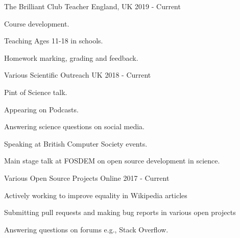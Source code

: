 \begin{cventries}
   \cventry
    {The Brilliant Club}
    {Teacher} %
    {England, UK}
    {2019 - Current}
    {\begin{cvitems} %
        \item {Course development.}
        \item {Teaching Ages 11-18 in schools.}
        \item {Homework marking, grading and feedback.}
      \end{cvitems}} %

   \cventry
    {Various}
    {Scientific Outreach} %
    {UK}
    {2018 - Current}
    {\begin{cvitems} %
        \item {Pint of Science talk.}
        \item {Appearing on Podcasts.}
        \item {Answering science questions on social media.}
        \item {Speaking at British Computer Society events.}
        \item {Main stage talk at FOSDEM on open source development in science.}
      \end{cvitems}} %

   \cventry
    {Various}
    {Open Source Projects} %
    {Online}
    {2017 - Current}
    {
    \begin{cvitems} %
        \item {Actively working to improve equality in Wikipedia articles}
        \item {Submitting pull requests and making bug reports in various open projects}
        \item {Answering questions on forums e.g., Stack Overflow.}
      \end{cvitems}} %



\end{cventries}